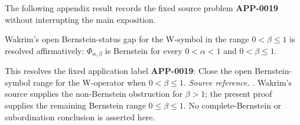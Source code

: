 The following appendix result records the fixed source problem \textbf{APP-0019} without interrupting the main exposition.
\begin{corollary}
\label{res:wakrim-w-operator-bf-gap-solved}
Wakrim's open Bernstein-status gap for the W-symbol in the range \(0<\beta\le1\) is resolved affirmatively: \(\Phi_{\alpha,\beta}\) is Bernstein for every \(0<\alpha<1\) and \(0<\beta\le1\).

This resolves the fixed application label \textbf{APP-0019}: Close the open Bernstein-symbol range for the W-operator when \(0<\beta\le1\).
\emph{Source reference.} \cite{app-app-0019-source}.
Wakrim's source supplies the non-Bernstein obstruction for \(\beta>1\); the present proof supplies the remaining Bernstein range \(0\le\beta\le1\). No complete-Bernstein or subordination conclusion is asserted here.
\end{corollary}

